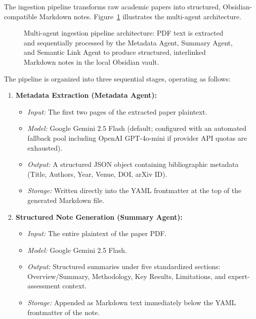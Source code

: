 \documentclass[runningheads]{llncs}
\begin{document}
The ingestion pipeline transforms raw academic papers into structured, Obsidian-compatible Markdown notes. Figure~\ref{fig:pipeline_diagram} illustrates the multi-agent architecture.

\begin{figure}[!htbp]
\centering
\caption{Multi-agent ingestion pipeline architecture: PDF text is extracted and sequentially processed by the Metadata Agent, Summary Agent, and Semantic Link Agent to produce structured, interlinked Markdown notes in the local Obsidian vault.}
\label{fig:pipeline_diagram}
\end{figure}

The pipeline is organized into three sequential stages, operating as follows:

\begin{enumerate}
    \item \textbf{Metadata Extraction (Metadata Agent):} 
    \begin{itemize}
        \item \textit{Input:} The first two pages of the extracted paper plaintext.
        \item \textit{Model:} Google Gemini 2.5 Flash (default; configured with an automated fallback pool including OpenAI GPT-4o-mini if provider API quotas are exhausted).
        \item \textit{Output:} A structured JSON object containing bibliographic metadata (Title, Authors, Year, Venue, DOI, arXiv ID).
        \item \textit{Storage:} Written directly into the YAML frontmatter at the top of the generated Markdown file.
    \end{itemize}
    
    \item \textbf{Structured Note Generation (Summary Agent):}
    \begin{itemize}
        \item \textit{Input:} The entire plaintext of the paper PDF.
        \item \textit{Model:} Google Gemini 2.5 Flash.
        \item \textit{Output:} Structured summaries under five standardized sections: Overview/Summary, Methodology, Key Results, Limitations, and expert-assessment context.
        \item \textit{Storage:} Appended as Markdown text immediately below the YAML frontmatter of the note.
    \end{itemize}
    

\end{enumerate}
\end{document}
